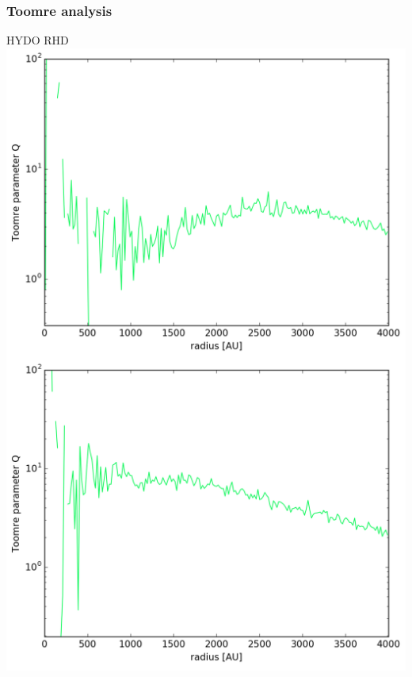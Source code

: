 \documentclass{beamer}
\begin{document}
\begin{frame}
\frametitle{Toomre analysis}
 \centering
 HYDO \hspace{4cm} RHD\\
 \colorbox{white}{
  \includegraphics[width=0.4\paperwidth]{../Figures/toomre_hydro.png}
  \includegraphics[width=0.4\paperwidth]{../Figures/toomre_rt.png}
 }
\end{frame}
\end{document}
